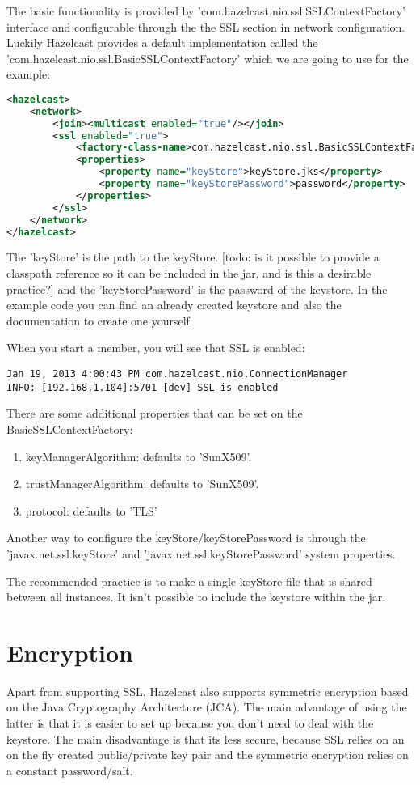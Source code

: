 The basic functionality is provided by 'com.hazelcast.nio.ssl.SSLContextFactory' interface and configurable through the the SSL section in network configuration. Luckily Hazelcast provides a default implementation called the 'com.hazelcast.nio.ssl.BasicSSLContextFactory' which we are going to use for the example:
\begin{lstlisting}[language=xml]
<hazelcast>
    <network>
        <join><multicast enabled="true"/></join>
        <ssl enabled="true">
            <factory-class-name>com.hazelcast.nio.ssl.BasicSSLContextFactory</factory-class-name>
            <properties>
                <property name="keyStore">keyStore.jks</property>
                <property name="keyStorePassword">password</property>
            </properties>
        </ssl>
    </network>
</hazelcast>
\end{lstlisting}
The 'keyStore' is the path to the keyStore. [todo: is it possible to provide a classpath reference so it can be included in the jar, and is this a desirable practice?] and the 'keyStorePassword' is the password of the keystore. In the example code you can find an already created keystore and also the documentation to create one yourself.

When you start a member, you will see that SSL is enabled:
\begin{lstlisting}
Jan 19, 2013 4:00:43 PM com.hazelcast.nio.ConnectionManager
INFO: [192.168.1.104]:5701 [dev] SSL is enabled
\end{lstlisting}

There are some additional properties that can be set on the BasicSSLContextFactory:
\begin{enumerate}
\item keyManagerAlgorithm: defaults to 'SunX509'.
\item trustManagerAlgorithm: defaults to 'SunX509'.
\item protocol: defaults to 'TLS'
\end{enumerate}
Another way to configure the keyStore/keyStorePassword is through the 'javax.net.ssl.keyStore' and 'javax.net.ssl.keyStorePassword' system properties.

The recommended practice is to make a single keyStore file that is shared between all instances. It isn't possible to include the keystore within the jar.

\section{Encryption}
Apart from supporting SSL, Hazelcast also supports symmetric encryption based on the Java Cryptography Architecture (JCA). The main advantage of using the latter is that it is easier to set up because you don't need to deal with the keystore. The main disadvantage is that its less secure, because SSL relies on an on the fly created public/private key pair and the symmetric encryption relies on a constant password/salt.


